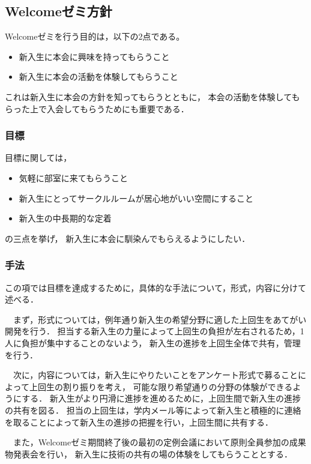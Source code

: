 \subsection*{Welcomeゼミ方針}


Welcomeゼミを行う目的は，以下の2点である。

\begin{itemize}
    \item 新入生に本会に興味を持ってもらうこと
    \item 新入生に本会の活動を体験してもらうこと
\end{itemize}
これは新入生に本会の方針を知ってもらうとともに，
本会の活動を体験してもらった上で入会してもらうためにも重要である．

\subsubsection*{目標}
目標に関しては，
\begin{itemize}
    \item 気軽に部室に来てもらうこと
    \item 新入生にとってサークルルームが居心地がいい空間にすること
    \item 新入生の中長期的な定着
\end{itemize}
の三点を挙げ，
新入生に本会に馴染んでもらえるようにしたい．

\subsubsection*{手法}
この項では目標を達成するために，具体的な手法について，形式，内容に分けて述べる．

　まず，形式については，例年通り新入生の希望分野に適した上回生をあてがい開発を行う．
担当する新入生の力量によって上回生の負担が左右されるため，1人に負担が集中することのないよう，
新入生の進捗を上回生全体で共有，管理を行う．

　次に，内容については，新入生にやりたいことをアンケート形式で募ることによって上回生の割り振りを考え，
可能な限り希望通りの分野の体験ができるようにする．
新入生がより円滑に進捗を進めるために，上回生間で新入生の進捗の共有を図る．
担当の上回生は，学内メール等によって新入生と積極的に連絡を取ることによって新入生の進捗の把握を行い，上回生間に共有する．

　また，Welcomeゼミ期間終了後の最初の定例会議において原則全員参加の成果物発表会を行い，
新入生に技術の共有の場の体験をしてもらうこととする．

